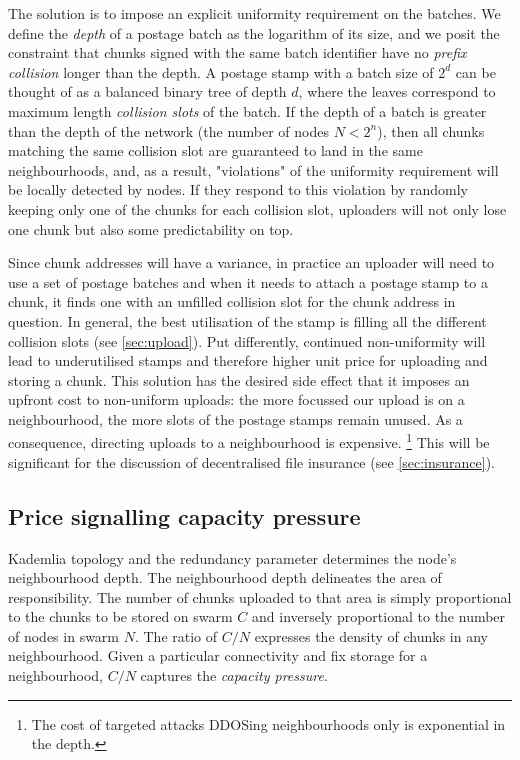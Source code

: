 The solution is to impose an explicit uniformity requirement on the batches. We define the \emph{depth} of a postage batch as the logarithm of its size, and we posit the constraint that chunks signed with the same batch identifier have no \emph{prefix collision} longer than the depth. A postage stamp with a batch size of $2^d$ can be thought of as a balanced binary tree of depth $d$, where the leaves correspond to maximum length \emph{collision slots} of the batch. If the depth of a batch is greater than the depth of the network (the number of nodes $N<2^n$), then all chunks matching the same collision slot are guaranteed to land in the same neighbourhoods, and, as a result, "violations" of the uniformity requirement will be locally detected by nodes. If they respond to this violation by randomly keeping only one of the chunks for each collision slot, uploaders will not only lose one chunk but also some predictability on top.

Since chunk addresses will have a variance, in practice an uploader will need to use a set of postage batches and when it needs to attach a postage stamp to a chunk, it finds one with an unfilled collision slot for the chunk address in question.  In general, the best utilisation of the stamp is filling all the different collision slots (see \ref{sec:upload}). Put differently, continued non-uniformity will lead to underutilised stamps and therefore higher unit price for uploading and storing a chunk. This solution has the desired side effect that it imposes an upfront cost to non-uniform uploads: the more focussed our upload is on a neighbourhood, the more slots of the postage stamps remain unused. As a consequence, directing uploads to a neighbourhood is expensive.%
%
\footnote{The cost of targeted attacks DDOSing neighbourhoods only is exponential in the depth.}
%
This will be significant for the discussion of decentralised file insurance (see \ref{sec:insurance}).


\subsection{Price signalling capacity pressure}\label{sec:capacity-pressure}

Kademlia topology and the redundancy parameter determines the node's neighbourhood depth. The neighbourhood depth delineates the area of responsibility. The number of chunks uploaded to that area is simply proportional to the chunks to be stored on swarm $C$ and inversely proportional to the number of nodes in swarm $N$. The ratio of $C/N$ expresses the density of chunks in any neighbourhood. Given a particular connectivity and fix storage for a neighbourhood, $C/N$ captures the \emph{capacity pressure}. 


